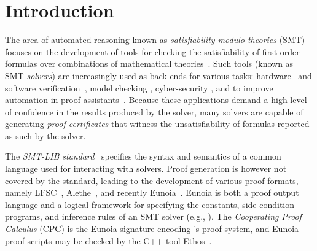 \documentclass[class=llncs, crop=false]{standalone}
\begin{document}
\section{Introduction}\label{sec:intro}
%
The area of automated reasoning known as
\emph{satisfiability modulo theories} (SMT)
focuses on the development of tools for
checking the satisfiability of first-order
formulas over combinations of mathematical
theories~\cite{Barrett2021}.
%
Such tools (known as SMT \emph{solvers}) are
increasingly used as back-ends for various tasks:
hardware~\cite{DBLP:conf/fmcad/MattareiMBDHH18} and
software verification~\cite{barnett06boogie,riant23debugging,kosmatov16frama-c},
%
model checking \cite{DBLP:conf/cav/ChampionMST16},
cyber-security \cite{Backes2018,rungta22billion},
and to improve automation in proof
assistants~\cite{DBLP:conf/cpp/ArmandFGKTW11,DBLP:journals/jar/BlanchetteBP13}.
%
Because these applications demand a high level
of confidence in the results produced by the solver,
many solvers are capable of generating
\emph{proof certificates}
that witness the unsatisfiability of formulas
reported as such by the solver.
%

The \emph{SMT-LIB standard}~\cite{Barrett2015-standard}
specifies the syntax and semantics of a
common language used for interacting with solvers.
Proof generation is however not covered by the standard,
leading to the development of various proof formats,
namely LFSC~\cite{DBLP:journals/fmsd/StumpORHT13},
Alethe~\cite{schurrAletheGenericSMT2021},
and recently Eunoia~\cite{EthosUser_manualmdMain}.
%
Eunoia is both a proof output language and a logical framework
for specifying the constants, side-condition programs,
and inference rules of an SMT solver (e.g., ).
The \emph{Cooperating Proof Calculus} (CPC) is the
Eunoia signature encoding 's proof system,
and Eunoia proof scripts may be checked by the C++ tool
Ethos~\cite{EthosUser_manualmdMain}.
%
%
\end{document}

